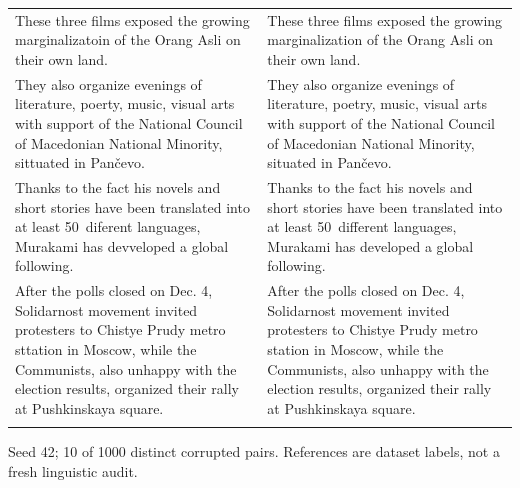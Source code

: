 \documentclass[10pt]{article}
\begin{document}
{\begin{tabular}{@{}>{\raggedright\arraybackslash}p{}@{\hspace{0.04\textwidth}}>{\raggedright\arraybackslash}p{}@{}}
These three films exposed the growing marginalizatoin of the Orang Asli on their own land. & These three films exposed the growing marginalization of the Orang Asli on their own land. \\ \addlinespace[5pt]
They also organize evenings of literature, poerty, music, visual arts with support of the National Council of Macedonian National Minority, sittuated in Pančevo. & They also organize evenings of literature, poetry, music, visual arts with support of the National Council of Macedonian National Minority, situated in Pančevo. \\ \addlinespace[5pt]
Thanks to the fact his novels and short stories have been translated into at least 50 diferent languages, Murakami has devveloped a global following. & Thanks to the fact his novels and short stories have been translated into at least 50 different languages, Murakami has developed a global following. \\ \addlinespace[5pt]
After the polls closed on Dec. 4, Solidarnost movement invited protesters to Chistye Prudy metro sttation in Moscow, while the Communists, also unhappy with the election results, organized their rally at Pushkinskaya square. & After the polls closed on Dec. 4, Solidarnost movement invited protesters to Chistye Prudy metro station in Moscow, while the Communists, also unhappy with the election results, organized their rally at Pushkinskaya square. \\ \addlinespace[5pt]
\bottomrule\end{tabular}}%
\ifdim\dimexpr\ht\pairtable+\dp\pairtable\relax>0.82\textheight%
\resizebox*{!}{0.82\textheight}{\usebox{\pairtable}}%
\else\usebox{\pairtable}\fi%
\par\smallskip\footnotesize Seed 42; 10 of 1000 distinct corrupted pairs. References are dataset labels, not a fresh linguistic audit.\normalsize
\clearpage
\end{document}
